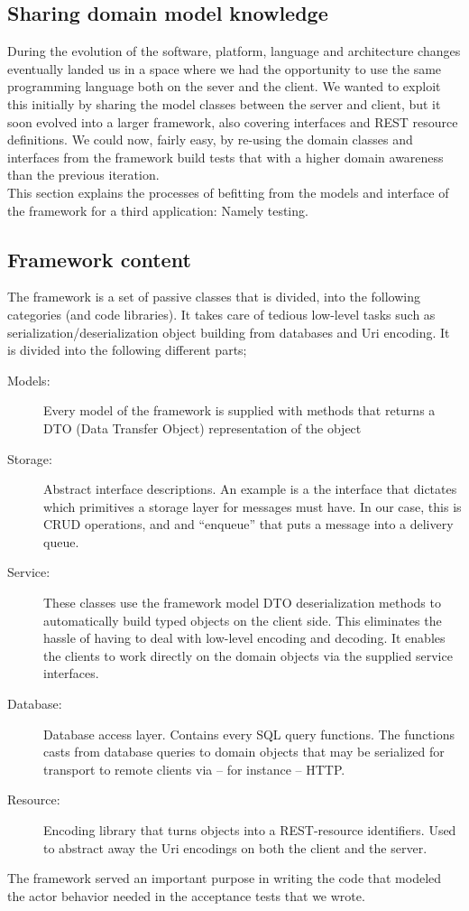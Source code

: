 \subsection{Sharing domain model knowledge}
During the evolution of the software, platform, language and architecture changes eventually landed us in a space where we had the opportunity to use the same programming language both on the sever and the client. We wanted to exploit this initially by sharing the model classes between the server and client, but it soon evolved into a larger framework, also covering interfaces and REST resource definitions. We could now, fairly easy, by re-using the domain classes and interfaces from the framework build tests that with a higher domain awareness than the previous iteration.\\
This section explains the processes of befitting from the models and interface of the framework for a third application: Namely testing. 

\subsection{Framework content}
\label{ssec:openreception_framework}
The framework is a set of passive classes that is divided, into the following categories (and code libraries). It takes care of tedious low-level tasks such as serialization/deserialization object building from databases and Uri encoding. It is divided into the following different parts;
\begin{description}
  \item[Models:] Every model of the framework is supplied with methods that returns a DTO (Data Transfer Object) representation of the object
  \item[Storage:] Abstract interface descriptions. An example is a the interface that dictates which primitives a storage layer for messages must have. In our case, this is CRUD operations, and and ``enqueue'' that puts a message into a delivery queue.
  \item[Service:] These classes use the framework model DTO deserialization methods to automatically build typed objects on the client side. This eliminates the hassle of having to deal with low-level encoding and decoding. It enables the clients to work directly on the domain objects via the supplied service interfaces.
  \item[Database:] Database access layer. Contains every SQL query functions. The functions casts from database queries to domain objects that may be serialized for transport to remote clients via -- for instance -- HTTP.
  \item[Resource:] Encoding library that turns objects into a REST-resource identifiers. Used to abstract away the Uri encodings on both the client and the server.
\end{description}
The framework served an important purpose in writing the code that modeled the actor behavior needed in the acceptance tests that we wrote.
